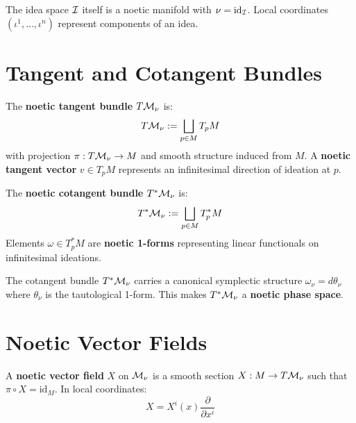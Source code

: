 \begin{example}
\label{ex:idea-space-manifold}
The idea space $\mathcal{I}$ itself is a noetic manifold with $\nu = \mathrm{id}_{\mathcal{I}}$.
Local coordinates $(\iota^1, \ldots, \iota^n)$ represent components of an idea.
\end{example}

\section{Tangent and Cotangent Bundles}

\begin{definition}
\label{def:tangent-bundle}
The \textbf{noetic tangent bundle} $T\mathcal{M}_\nu$ is:
\[
    T\mathcal{M}_\nu := \bigsqcup_{p \in M} T_pM
\]
with projection $\pi : T\mathcal{M}_\nu \to M$ and smooth structure induced from $M$.
A \textbf{noetic tangent vector} $v \in T_pM$ represents an infinitesimal
direction of ideation at $p$.
\end{definition}

\begin{definition}
\label{def:cotangent-bundle}
The \textbf{noetic cotangent bundle} $T^*\mathcal{M}_\nu$ is:
\[
    T^*\mathcal{M}_\nu := \bigsqcup_{p \in M} T_p^*M
\]
Elements $\omega \in T_p^*M$ are \textbf{noetic 1-forms} representing linear
functionals on infinitesimal ideations.
\end{definition}

\begin{proposition}
\label{prop:phase-space}
The cotangent bundle $T^*\mathcal{M}_\nu$ carries a canonical symplectic structure
$\omega_\nu = d\theta_\nu$ where $\theta_\nu$ is the tautological 1-form.
This makes $T^*\mathcal{M}_\nu$ a \textbf{noetic phase space}.
\end{proposition}

\section{Noetic Vector Fields}

\begin{definition}
\label{def:noetic-vector-field}
A \textbf{noetic vector field} $X$ on $\mathcal{M}_\nu$ is a smooth section
$X : M \to T\mathcal{M}_\nu$ such that $\pi \circ X = \mathrm{id}_M$.
In local coordinates:
\[
    X = X^i(x) \frac{\partial}{\partial x^i}
\]
\end{definition}


